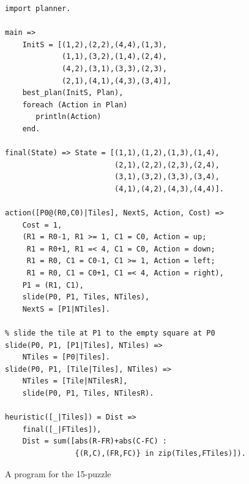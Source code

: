 \begin{figure}[t]
\begin{center}
\begin{verbatim}
import planner.

main =>
    InitS = [(1,2),(2,2),(4,4),(1,3),
             (1,1),(3,2),(1,4),(2,4),
             (4,2),(3,1),(3,3),(2,3),
             (2,1),(4,1),(4,3),(3,4)],
    best_plan(InitS, Plan),
    foreach (Action in Plan)
       println(Action)
    end.

final(State) => State = [(1,1),(1,2),(1,3),(1,4),
                         (2,1),(2,2),(2,3),(2,4),
                         (3,1),(3,2),(3,3),(3,4),
                         (4,1),(4,2),(4,3),(4,4)].

action([P0@(R0,C0)|Tiles], NextS, Action, Cost) =>
    Cost = 1,
    (R1 = R0-1, R1 >= 1, C1 = C0, Action = up;
     R1 = R0+1, R1 =< 4, C1 = C0, Action = down;
     R1 = R0, C1 = C0-1, C1 >= 1, Action = left;
     R1 = R0, C1 = C0+1, C1 =< 4, Action = right),
    P1 = (R1, C1),
    slide(P0, P1, Tiles, NTiles),
    NextS = [P1|NTiles].

% slide the tile at P1 to the empty square at P0
slide(P0, P1, [P1|Tiles], NTiles) =>
    NTiles = [P0|Tiles].
slide(P0, P1, [Tile|Tiles], NTiles) =>
    NTiles = [Tile|NTilesR],
    slide(P0, P1, Tiles, NTilesR).

heuristic([_|Tiles]) = Dist =>
    final([_|FTiles]),
    Dist = sum([abs(R-FR)+abs(C-FC) : 
                {(R,C),(FR,FC)} in zip(Tiles,FTiles)]).
\end{verbatim}
\end{center}
\caption{\label{fig:15puzzlesol}A program for the 15-puzzle}
\end{figure}



